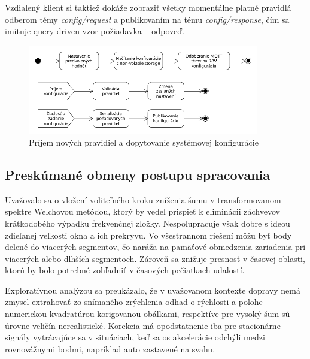 Vzdialený klient si taktiež dokáže zobraziť všetky momentálne platné pravidlá odberom témy \emph{config/request} a publikovaním na tému
\emph{config/response}, čím sa imituje query-driven vzor požiadavka -- odpoveď.

\begin{figure}[h]
	\centering
	\includegraphics[width=0.9\textwidth]{figures/design/configuration.png}
	\caption{Príjem nových pravidiel a dopytovanie systémovej konfigurácie}
	\label{config-change}
\end{figure}

\subsection{Preskúmané obmeny postupu spracovania}
Uvažovalo sa o vložení voliteľného kroku zníženia šumu v transformovanom spektre Welchovou metódou, ktorý by vedel prispieť
k eliminácii záchvevov krátkodobého výpadku frekvenčnej zložky. Nespolupracuje však dobre s ideou zdieľanej veľkosti okna a
ich prekryvu. Vo všestrannom riešení môžu byť body delené do viacerých segmentov, čo naráža na pamäťové obmedzenia zariadenia
pri viacerých alebo dlhších segmentoch. Zároveň sa znižuje presnosť v časovej oblasti, ktorú by bolo potrebné zohľadniť v časových
pečiatkach udalostí.

Exploratívnou analýzou sa preukázalo, že v uvažovanom kontexte dopravy nemá zmysel extrahovať zo snímaného zrýchlenia odhad
o rýchlosti a polohe numerickou kvadratúrou korigovanou obálkami, respektíve pre vysoký šum sú úrovne veličín nerealistické.
Korekcia má opodstatnenie iba pre stacionárne signály vytrácajúce sa v situáciach, keď sa os akcelerácie odchýli medzi
rovnovážnymi bodmi, napríklad auto zastavené na svahu.

